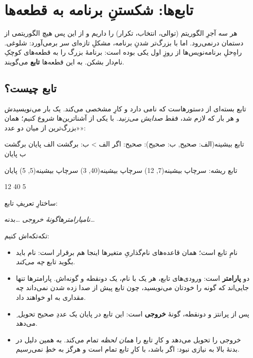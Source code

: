 \chapter{تابع‌ها: شکستنِ برنامه به قطعه‌ها}%
\label{ch:functions}

هر سه آجرِ الگوریتم (توالی، انتخاب، تکرار) را داریم و از این پس هیچ
الگوریتمی از دستمان درنمی‌رود. اما با بزرگ‌تر شدنِ برنامه، مشکلِ تازه‌ای سر
برمی‌آورد: شلوغی. راهِ‌حلِ برنامه‌نویس‌ها از روزِ اول یکی بوده است: برنامهٔ
بزرگ را به قطعه‌های کوچکِ نام‌دار بشکن. به این قطعه‌ها \textbf{تابع}
می‌گویند.

\section{تابع چیست؟}

تابع بسته‌ای از دستورهاست که نامی دارد و کارِ مشخصی می‌کند. یک بار
می‌نویسیدش و هر بار که لازم شد، فقط \emph{صدایش می‌زنید}. با یکی از
آشناترین‌ها شروع کنیم؛ همان «بزرگ‌ترین از میان دو عدد»:

\begin{salamfa}
تابع بیشینه(الف: صحیح, ب: صحیح): صحیح:
    اگر الف > ب:
        برگشت الف
    پایان
    برگشت ب
پایان

تابع ریشه:
    سرچاپ بیشینه(7, 12)
    سرچاپ بیشینه(40, 3)
    سرچاپ بیشینه(5, 5)
پایان
\end{salamfa}

\begin{progout}
12
40
5
\end{progout}

ساختارِ تعریفِ تابع:

\begin{center}
 \;\textit{نام}\code{(}\textit{پارامترها}\code{):}\;\textit{گونهٔ خروجی}\;\code{:}
\quad\ldots\;بدنه\;\ldots\quad {}
\end{center}

تکه‌تکه‌اش کنیم:

\begin{itemize}
  \item {} نامِ تابع است؛ همان قاعده‌های نام‌گذاریِ متغیرها
        اینجا هم برقرار است: نام باید بگوید تابع \emph{چه می‌کند}.
  \item {} دو \textbf{پارامتر} است: ورودی‌های
        تابع، هر یک با نام، یک دونقطه و گونه‌اش. پارامترها تنها جایی‌اند
        که گونه را خودتان می‌نویسید، چون تابع پیش از صدا زده شدن نمی‌داند
        چه مقداری به او خواهند داد.
  \item {}ِ پس از پرانتز و دونقطه، گونهٔ \textbf{خروجی} است: این
        تابع در پایان یک عددِ صحیح تحویل می‌دهد.
  \item {} خروجی را تحویل می‌دهد و کارِ تابع را \emph{همان
        لحظه} تمام می‌کند. به همین دلیل در بدنهٔ بالا به 
        نیازی نبود: اگر  باشد، با  کارِ
        تابع تمام است و هرگز به خطِ  نمی‌رسیم.
\end{itemize}

